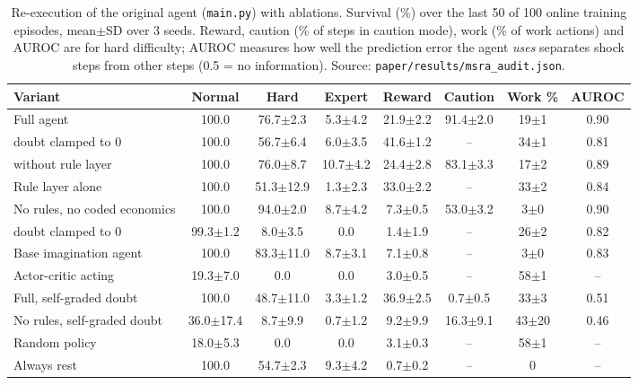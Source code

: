 \begin{table}[t]
\centering\scriptsize
\setlength{\tabcolsep}{3pt}
\caption{Re-execution of the original agent (\texttt{main.py}) with ablations. Survival (\%) over the last 50 of 100 online training episodes, mean$\pm$SD over 3 seeds. Reward, caution (\% of steps in caution mode), work (\% of work actions) and AUROC are for hard difficulty; AUROC measures how well the prediction error the agent \emph{uses} separates shock steps from other steps (0.5 = no information). Source: \texttt{paper/results/msra\_audit.json}.}
\label{tab:msra-audit}
\begin{tabular}{lccccccc}
\toprule
Variant & Normal & Hard & Expert & Reward & Caution & Work \% & AUROC\\
\midrule
Full agent & 100.0 & 76.7$\pm$2.3 & 5.3$\pm$4.2 & 21.9$\pm$2.2 & 91.4$\pm$2.0 & 19$\pm$1 & 0.90\\
\quad doubt clamped to 0 & 100.0 & 56.7$\pm$6.4 & 6.0$\pm$3.5 & 41.6$\pm$1.2 & -- & 34$\pm$1 & 0.81\\
\quad without rule layer & 100.0 & 76.0$\pm$8.7 & 10.7$\pm$4.2 & 24.4$\pm$2.8 & 83.1$\pm$3.3 & 17$\pm$2 & 0.89\\
Rule layer alone & 100.0 & 51.3$\pm$12.9 & 1.3$\pm$2.3 & 33.0$\pm$2.2 & -- & 33$\pm$2 & 0.84\\
\addlinespace[2pt]
No rules, no coded economics & 100.0 & 94.0$\pm$2.0 & 8.7$\pm$4.2 & 7.3$\pm$0.5 & 53.0$\pm$3.2 & 3$\pm$0 & 0.90\\
\quad doubt clamped to 0 & 99.3$\pm$1.2 & 8.0$\pm$3.5 & 0.0 & 1.4$\pm$1.9 & -- & 26$\pm$2 & 0.82\\
\addlinespace[2pt]
Base imagination agent & 100.0 & 83.3$\pm$11.0 & 8.7$\pm$3.1 & 7.1$\pm$0.8 & -- & 3$\pm$0 & 0.83\\
Actor-critic acting & 19.3$\pm$7.0 & 0.0 & 0.0 & 3.0$\pm$0.5 & -- & 58$\pm$1 & --\\
\addlinespace[2pt]
Full, self-graded doubt & 100.0 & 48.7$\pm$11.0 & 3.3$\pm$1.2 & 36.9$\pm$2.5 & 0.7$\pm$0.5 & 33$\pm$3 & 0.51\\
No rules, self-graded doubt & 36.0$\pm$17.4 & 8.7$\pm$9.9 & 0.7$\pm$1.2 & 9.2$\pm$9.9 & 16.3$\pm$9.1 & 43$\pm$20 & 0.46\\
\addlinespace[2pt]
Random policy & 18.0$\pm$5.3 & 0.0 & 0.0 & 3.1$\pm$0.3 & -- & 58$\pm$1 & --\\
Always rest & 100.0 & 54.7$\pm$2.3 & 9.3$\pm$4.2 & 0.7$\pm$0.2 & -- & 0 & --\\
\bottomrule
\end{tabular}
\end{table}
